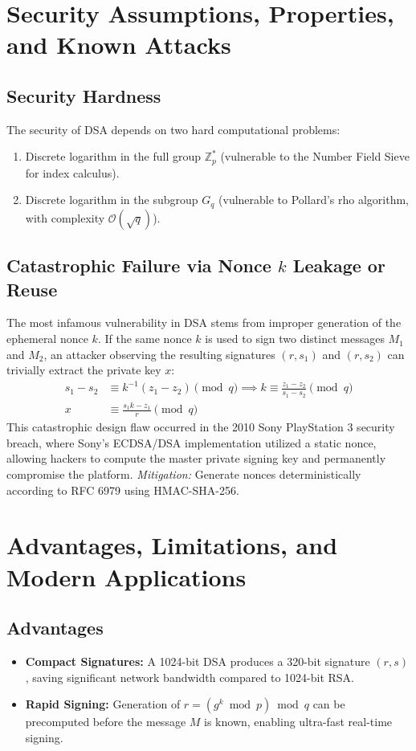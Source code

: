 \section{Security Assumptions, Properties, and Known Attacks}
\subsection{Security Hardness}
The security of DSA depends on two hard computational problems:
\begin{enumerate}
    \item Discrete logarithm in the full group $\mathbb{Z}_p^*$ (vulnerable to the Number Field Sieve for index calculus).
    \item Discrete logarithm in the subgroup $G_q$ (vulnerable to Pollard's rho algorithm, with complexity $\mathcal{O}(\sqrt{q})$).
\end{enumerate}

\subsection{Catastrophic Failure via Nonce $k$ Leakage or Reuse}
The most infamous vulnerability in DSA stems from improper generation of the ephemeral nonce $k$.
If the same nonce $k$ is used to sign two distinct messages $M_1$ and $M_2$, an attacker observing the resulting signatures $(r, s_1)$ and $(r, s_2)$ can trivially extract the private key $x$:
\begin{align}
s_1 - s_2 &\equiv k^{-1} (z_1 - z_2) \pmod q \implies k \equiv \frac{z_1 - z_2}{s_1 - s_2} \pmod q \\
x &\equiv \frac{s_1 k - z_1}{r} \pmod q
\end{align}
This catastrophic design flaw occurred in the 2010 Sony PlayStation 3 security breach, where Sony's ECDSA/DSA implementation utilized a static nonce, allowing hackers to compute the master private signing key and permanently compromise the platform. \emph{Mitigation:} Generate nonces deterministically according to RFC 6979 \cite{rfc6979} using HMAC-SHA-256.

\section{Advantages, Limitations, and Modern Applications}
\subsection{Advantages}
\begin{itemize}
    \item \textbf{Compact Signatures:} A 1024-bit DSA produces a 320-bit signature $(r, s)$, saving significant network bandwidth compared to 1024-bit RSA.
    \item \textbf{Rapid Signing:} Generation of $r = (g^k \bmod p) \bmod q$ can be precomputed before the message $M$ is known, enabling ultra-fast real-time signing.
\end{itemize}

